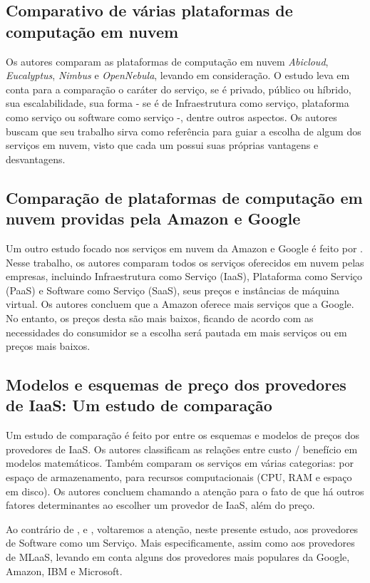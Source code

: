 \documentclass{article}
\begin{document}
\subsection{Comparativo de várias plataformas de computação em nuvem}
Os autores \cite{peng2009comparison} comparam as plataformas de computação em nuvem \textit{Abicloud}, \textit{Eucalyptus}, \textit{Nimbus} e \textit{OpenNebula}, levando em consideração. O estudo leva em conta para a comparação o caráter do serviço, se é privado, público ou híbrido, sua escalabilidade, sua forma - se é de Infraestrutura como serviço, plataforma como serviço ou software como serviço -, dentre outros aspectos. Os autores buscam que seu trabalho sirva como referência para guiar a escolha de algum dos serviços em nuvem, visto que cada um possui suas próprias vantagens e desvantagens.

\subsection{Comparação de plataformas de computação em nuvem providas pela Amazon e Google}
Um outro estudo focado nos serviços em nuvem da Amazon e Google é feito por \cite{hyseni2017comparison}. Nesse trabalho, os autores comparam todos os serviços oferecidos em nuvem pelas empresas, incluindo Infraestrutura como Serviço (IaaS), Plataforma como Serviço (PaaS) e Software como Serviço (SaaS), seus preços e instâncias de máquina virtual. Os autores concluem que a Amazon oferece mais serviços que a Google. No entanto, os preços desta são mais baixos, ficando de acordo com as necessidades do consumidor se a escolha será pautada em mais serviços ou em preços mais baixos.

\subsection{Modelos e esquemas de preço dos provedores de IaaS: Um estudo de comparação}
Um estudo de comparação é feito por \cite{murthy2012pricing} entre os esquemas e modelos de preços dos provedores de IaaS. Os autores classificam as relações entre custo / benefício em modelos matemáticos. Também comparam os serviços em várias categorias: por espaço de armazenamento, para recursos computacionais (CPU, RAM e espaço em disco). Os autores concluem chamando a atenção para o fato de que há outros fatores determinantes ao escolher um provedor de IaaS, além do preço.

Ao contrário de \cite{peng2009comparison}, \cite{hyseni2017comparison} e \cite{murthy2012pricing}, voltaremos a atenção, neste presente estudo, aos provedores de Software como um Serviço. Mais especificamente, assim como \cite{yao2017} aos provedores de MLaaS, levando em conta alguns dos provedores mais populares da Google, Amazon, IBM e Microsoft. 
\end{document}
